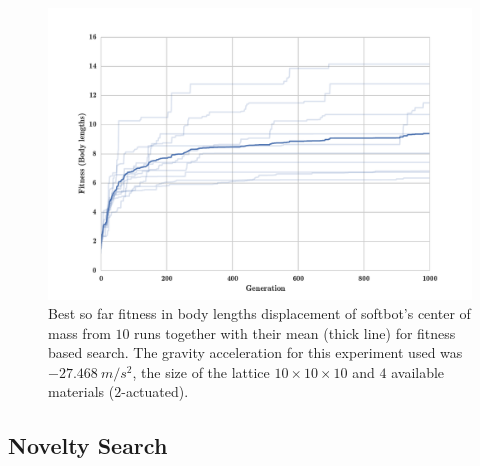 \begin{figure}[h!]
\centering
\includegraphics[width=1.0\textwidth]{Figures/Results/indRunsAvgSize10Fitness.pdf}
\caption{Best so far fitness in body lengths displacement of softbot's center of mass from $10$ runs together with their mean (thick line) for fitness based search. The gravity acceleration for this experiment used was $-27.468\   m/s^2$, the size of the lattice $10\times 10\times10$ and $4$ available materials ($2$-actuated).}
\label{fig:indRunsAvgSize10Fitness}
\end{figure}















\clearpage
\subsection{Novelty Search}

